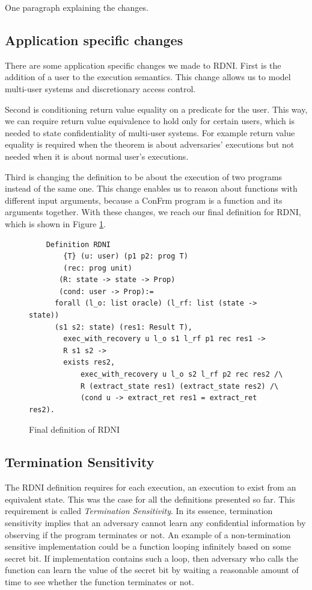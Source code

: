 {\color{red} One paragraph explaining the changes.}


\subsection{Application specific changes}
There are some application specific changes we made to RDNI. First is the addition of a user to the execution semantics. This change allows us to model multi-user systems and discretionary access control.

Second is conditioning return value equality on a predicate for the user. This way, we can require return value equivalence to hold only for certain users, which is needed to state confidentiality of multi-user systems. For example return value equality is required when the theorem is about adversaries' executions but not needed when it is about normal user's executions.

Third is changing the definition to be about the execution of two programs instead of the same one. This change enables us to reason about functions with different input arguments, because a ConFrm program is a function and its arguments together. 
With these changes, we reach our final definition for RDNI, which is shown in Figure \ref{fig:RDNI_final}.

\begin{figure}[H]
    \centering
    \begin{verbatim}
    Definition RDNI
        {T} (u: user) (p1 p2: prog T) 
        (rec: prog unit)
       (R: state -> state -> Prop) 
       (cond: user -> Prop):=
      forall (l_o: list oracle) (l_rf: list (state -> state))
      (s1 s2: state) (res1: Result T),
        exec_with_recovery u l_o s1 l_rf p1 rec res1 ->
        R s1 s2 ->
        exists res2,
            exec_with_recovery u l_o s2 l_rf p2 rec res2 /\
            R (extract_state res1) (extract_state res2) /\
            (cond u -> extract_ret res1 = extract_ret res2).
    \end{verbatim}
    \caption{Final definition of RDNI}
    \label{fig:RDNI_final}
\end{figure}

\subsection{Termination Sensitivity}
The RDNI definition requires for each execution, an execution to exist from an equivalent state. This was the case for all the definitions presented so far. This requirement is called \emph{Termination Sensitivity}. In its essence, termination sensitivity implies that an adversary cannot learn any confidential information by observing if the program terminates or not. An example of a non-termination sensitive implementation could be a function looping infinitely based on some secret bit. If implementation contains such a loop, then adversary who calls the function can learn the value of the secret bit by waiting a reasonable amount of time to see whether the function terminates or not.

